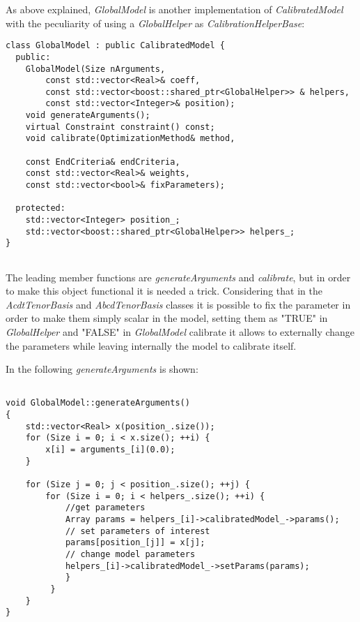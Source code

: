 As above explained, \textit{GlobalModel} is another implementation of \textit{CalibratedModel} with the peculiarity of using a \textit{GlobalHelper} as \textit{CalibrationHelperBase}:

\begin{lstlisting}
class GlobalModel : public CalibratedModel {
  public:
    GlobalModel(Size nArguments,
        const std::vector<Real>& coeff,
        const std::vector<boost::shared_ptr<GlobalHelper>> & helpers,
        const std::vector<Integer>& position);
    void generateArguments();
    virtual Constraint constraint() const;
    void calibrate(OptimizationMethod& method,
    
    const EndCriteria& endCriteria,
    const std::vector<Real>& weights,
    const std::vector<bool>& fixParameters);

  protected:
    std::vector<Integer> position_;
    std::vector<boost::shared_ptr<GlobalHelper>> helpers_;
}
 
\end{lstlisting}

The leading member functions are \textit{generateArguments} and \textit{calibrate}, but in order to make this object functional it is needed a trick. Considering that in the \textit{AcdtTenorBasis} and \textit{AbcdTenorBasis} classes it is possible to fix the parameter in order to make them simply scalar in the model, setting them as "TRUE" in \textit{GlobalHelper} and "FALSE" in \textit{GlobalModel} calibrate it allows to externally change the parameters while leaving internally the model to calibrate itself.

In the following \textit{generateArguments} is shown:

\begin{lstlisting}

void GlobalModel::generateArguments() 
{
    std::vector<Real> x(position_.size());
    for (Size i = 0; i < x.size(); ++i) {
        x[i] = arguments_[i](0.0);
    }
    
    for (Size j = 0; j < position_.size(); ++j) {
        for (Size i = 0; i < helpers_.size(); ++i) {
            //get parameters
            Array params = helpers_[i]->calibratedModel_->params(); 
            // set parameters of interest
            params[position_[j]] = x[j];
            // change model parameters
            helpers_[i]->calibratedModel_->setParams(params);
            }
         }
    }
}
    
\end{lstlisting}

